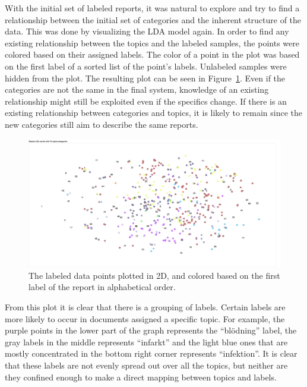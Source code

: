 With the initial set of labeled reports, it was natural to explore and try to find a relationship between the initial set of categories and the inherent structure of the data.
This was done by visualizing the LDA model again.
In order to find any existing relationship between the topics and the labeled samples, the points were colored based on their assigned labels.
The color of a point in the plot was based on the first label of a sorted list of the point's labels.
Unlabeled samples were hidden from the plot.
The resulting plot can be seen in Figure~\ref{fig:categories-lda-75}.
Even if the categories are not the same in the final system, knowledge of an existing relationship might still be exploited even if the specifics change.
If there is an existing relationship between categories and topics, it is likely to remain since the new categories still aim to describe the same reports.

\begin{figure}
    \centering
    \includegraphics[width=\textwidth]{figures/categories-lda-75.png}
    \caption{The labeled data points plotted in 2D, and colored based on the first label of the report in alphabetical order.}
    \label{fig:categories-lda-75}
\end{figure}

From this plot it is clear that there is a grouping of labels.
Certain labels are more likely to occur in documents assigned a specific topic.
For example, the purple points in the lower part of the graph represents the ``blödning'' label, the gray labels in the middle represents ``infarkt'' and the light blue ones that are mostly concentrated in the bottom right corner represents ``infektion''.
It is clear that these labels are not evenly spread out over all the topics, but neither are they confined enough to make a direct mapping between topics and labels.

